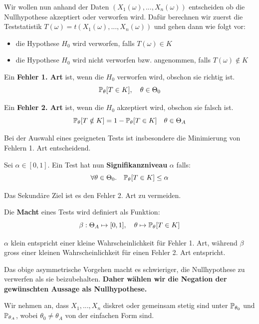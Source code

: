 Wir wollen nun anhand der Daten $(X_1(\omega), ..., X_n(\omega))$ entscheiden ob die Nullhypothese akzeptiert oder verworfen wird. Dafür berechnen wir zuerst die Teststatistik $T(\omega) = t(X_1(\omega), ..., X_n(\omega))$ und gehen dann wie folgt vor:
\begin{itemize}
    \item die Hypothese $H_0$ wird verworfen, falls $T(\omega) \in K$
    \item die Hypothese $H_0$ wird nicht verworfen bzw. angenommen, falls $T(\omega) \notin K$
\end{itemize}

Ein \textbf{Fehler 1. Art} ist, wenn die $H_0$ verworfen wird, obschon sie richtig ist.
$$\mathbb{P}_\theta[T \in K], \quad \theta \in \Theta_0$$

Ein \textbf{Fehler 2. Art} ist, wenn die $H_0$ akzeptiert wird, obschon sie falsch ist.
$$\mathbb{P}_\theta[T \notin K] = 1 - \mathbb{P}_\theta [T \in K] \quad \theta \in \Theta_A$$



Bei der Auswahl eines geeigneten Tests ist insbesondere die Minimierung von Fehlern 1. Art entscheidend. \smallskip

\begin{tcolorbox}
    Sei $\alpha \in [0,1]$. Ein Test hat nun \textbf{Signifikanzniveau} $\alpha$ falls:
    $$\forall \theta \in \Theta_0. \quad \mathbb{P}_\theta[T \in K] \leq \alpha$$
\end{tcolorbox}

Das Sekundäre Ziel ist es den Fehler 2. Art zu vermeiden. \smallskip

\begin{tcolorbox}
    Die \textbf{Macht} eines Tests wird definiert als Funktion:
    $$\beta: \Theta_A \mapsto [0,1], \quad \theta \mapsto \mathbb{P}_\theta[T \in K]$$
\end{tcolorbox}

\Bem $\alpha$ klein entspricht einer kleine Wahrscheinlichkeit für Fehler 1. Art, während $\beta$ gross einer kleinen Wahrscheinlichkeit für einen Fehler 2. Art entspricht. \smallskip

Das obige asymmetrische Vorgehen macht es schwieriger, die Nullhypothese zu verwerfen als sie beizubehalten. \textbf{Daher wählen wir die Negation der gewünschten Aussage als Nullhypothese.}



Wir nehmen an, dass $X_1,...,X_n$ diskret oder gemeinsam stetig sind unter $\mathbb{P}_{\theta_0}$ und $\mathbb{P}_{\theta_A}$, wobei $\theta_0 \neq \theta_A$ von der einfachen Form sind. \smallskip

